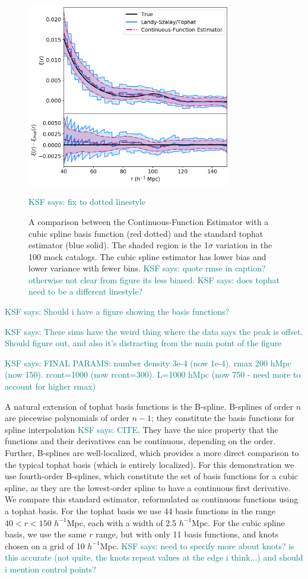 \documentclass[modern]{aastex62}
\newcommand{\est}{the Continuous-Function Estimator\xspace}
\newcommand{\hmpc}{$h^{-1}$Mpc}
\newcommand{\KSF}[1]{\textcolor{teal}{KSF says: #1}}
\begin{document}
\label{fig:spline}
\begin{figure}[ht]
\centering
    \includegraphics[width=0.8\textwidth]{tophat_cubic}
    \caption{A comparison between \est with a cubic spline basis function (red dotted) and the standard tophat estimator (blue solid). The shaded region is the 1$\sigma$ variation in the 100 mock catalogs. The cubic spline estimator has lower bias and lower variance with fewer bins. \KSF{quote rmse in caption? otherwise not clear from figure its less biased.} \KSF{does tophat need to be a different linestyle?}} \KSF{fix to dotted linestyle}

\end{figure}

\KSF{Should i have a figure showing the basis functions?}

\KSF{These sims have the weird thing where the data says the peak is offset. Should figure out, and also it's distracting from the main point of the figure}

\KSF{FINAL PARAMS:  number density 3e-4 (now 1e-4). rmax 200 hMpc (now 150). rcont=1000 (now rcont=300). L=1000 hMpc (now 750 - need more to account for higher rmax)}

A natural extension of tophat basis functions is the B-spline.
B-splines of order $n$ are piecewise polynomials of order $n-1$; they constitute the basis functions for spline interpolation \KSF{CITE}.
They have the nice property that the functions and their derivatives can be continuous, depending on the order.
Further, B-splines are well-localized, which provides a more direct comparison to the typical tophat basis (which is entirely localized).
For this demonstration we use fourth-order B-splines, which constitute the set of basis functions for a cubic spline, as they are the lowest-order spline to have a continuous first derivative.
We compare this standard estimator, reformulated as continuous functions using a tophat basis.
For the tophat basis we use 44 basis functions in the range $40 < r < 150$ \hmpc, each with a width of 2.5 \hmpc. 
For the cubic spline basis, we use the same $r$ range, but with only 11 basis functions, and knots chosen on a grid of 10 \hmpc.
\KSF{need to specify more about knots? is this accurate (not quite, the knots repeat values at the edge i think...) and should i mention control points?}
\end{document}
